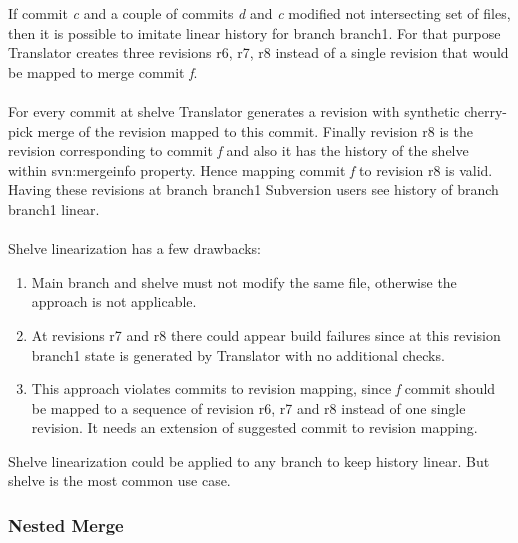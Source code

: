 If commit \emph{c} and a couple of commits \emph{d} and \emph{c} modified not intersecting set of files, then it is possible to imitate linear history for branch branch1. For that purpose Translator creates three revisions r6, r7, r8 instead of a single revision that would be mapped to merge commit \emph{f}.
\\\\
For every commit at shelve Translator generates a revision with synthetic cherry-pick merge of the revision mapped to this commit. Finally revision r8 is the revision corresponding to commit \emph{f} and also it has the history of the shelve within svn:mergeinfo property. Hence mapping commit \emph{f} to revision r8 is valid. Having these revisions at branch branch1 Subversion users see history of branch branch1 linear.
\\\\
Shelve linearization has a few drawbacks:
\begin{enumerate}
\compactlist
	\item Main branch and shelve must not modify the same file, otherwise the approach is not applicable.
	\item At revisions r7 and r8 there could appear build failures since at this revision branch1 state is generated by Translator with no additional checks.
	\item This approach violates commits to revision mapping, since \emph{f} commit should be mapped to a sequence of revision r6, r7 and r8 instead of one single revision. It needs an extension of suggested commit to revision mapping.
\end{enumerate}

Shelve linearization could be applied to any branch to keep history linear. But shelve is the most common use case.

\subsubsection{Nested Merge}

